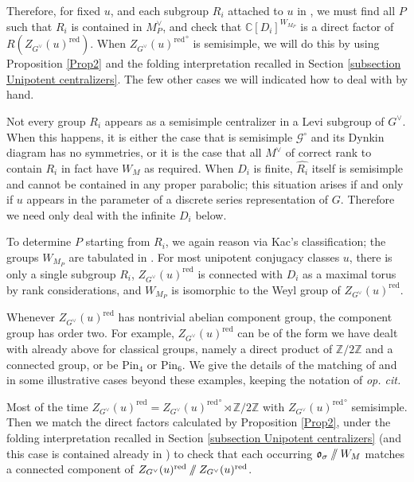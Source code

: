 \documentclass[10pt]{article}
\newcommand{\git}{\mathbin{
  \mathchoice{/\mkern-6mu/}%
    {/\mkern-6mu/}%
    {/\mkern-5mu/}%
    {/\mkern-5mu/}}}%
\newcommand{\Z}{\mathbb{Z}}
\newcommand{\C}{\mathbb{C}}
\theoremstyle{definition}
\theoremstyle{remark}
\newcommand{\Pin}{\mathrm{Pin}}
\newcommand{\Zur}{Z_{G^\vee}(u)^{\mathrm{red}}}
\newcommand{\Zz}{\mathcal{G}}
\begin{document}
Therefore, for fixed $u$, and each subgroup $R_i$ attached to $u$ in
\cite{Ale79}, 
we must find all $P$ such that $R_i$ is contained in $M_P^\vee$,
and check that $\C[D_i]^{W_{M_P}}$ is a direct factor
of $R(\Zur)$. When ${\Zur}^\circ$ is semisimple, we will do this by using Proposition \ref{Prop2} and the folding interpretation recalled in Section \ref{subsection Unipotent centralizers}. The few other cases we will indicated how to deal with by hand.

Not every group $R_i$ appears as a semisimple centralizer in a Levi subgroup of $G^\vee$. 
When this happens, it is either the case that is semisimple $\Zz^\circ$ and its Dynkin diagram has no symmetries,
or it is the case that all $M^\vee$ of correct rank to contain $R_i$ in fact have $W_{M}$ as required.
When $D_i$ is finite, $\hat{R_i}$ itself is semisimple and 
cannot be contained in any proper parabolic; this situation arises if 
and only if  
$u$ appears in the parameter of a discrete series 
representation of $G$. Therefore we need only deal with the infinite 
$D_i$ below. 

To determine $P$ starting from $R_i$, we again reason via Kac's classification;
the groups $W_{M_P}$ are tabulated in \cite{Howlett}. For most unipotent conjugacy classes $u$, there is only a single subgroup $R_i$, $\Zur$ is connected with $D_i$ as a maximal torus
by rank considerations, and $W_{M_P}$ is isomorphic to the Weyl group of $\Zur$. 

Whenever $\Zur$ has nontrivial abelian component group, the component group has order two.
For example, $\Zur$ can be of the form we have dealt with already above for classical groups, namely
a direct product of $\Z/2\Z$ and a connected group, or be $\Pin_4$ or $\Pin_6$.
We give the details of the matching of \cite{Ale79} and \cite{Howlett} in some illustrative cases
beyond these examples, keeping the notation of \textit{op. cit.}

Most of the time $\Zur={\Zur}^\circ\rtimes\Z/2\Z$ with ${\Zur}^\circ$ semisimple. Then
we match the direct factors calculated by Proposition \ref{Prop2}, under the folding interpretation recalled in Section \ref{subsection Unipotent centralizers} (and this case is contained already in \cite{diss})
to check that each occurring $\mathfrak{o}_\sigma\git W_M$ matches a connected
component of $\Zur\git\Zur$. 
\end{document}
